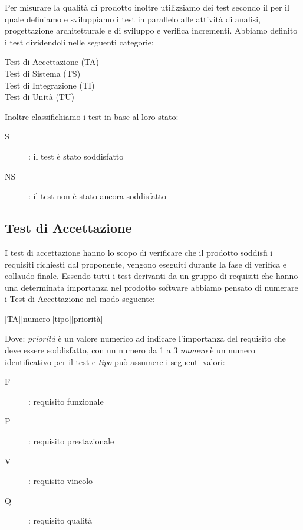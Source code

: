 \documentclass[../piano-di-qualifica.tex]{subfiles}
\begin{document}
\label{sub:test}
    Per misurare la qualità di prodotto inoltre utilizziamo dei test secondo il  per il quale definiamo e sviluppiamo i test in parallelo alle attività di analisi, progettazione architetturale e di sviluppo e verifica incrementi.
    Abbiamo definito i test dividendoli nelle seguenti categorie:
    \begin{description}
      \item [Test di Accettazione (TA)]
      \item [Test di Sistema (TS)]
      \item [Test di Integrazione (TI)]
      \item [Test di Unità (TU)]
    \end{description}
    Inoltre classifichiamo i test in base al loro stato:
      \begin{description}
        \item [S]: il test è stato soddisfatto
        \item [NS]: il test non è stato ancora soddisfatto
      \end{description}
  \subsection{Test di Accettazione}%
  \label{subs:accettazione}
      I test di accettazione hanno lo scopo di verificare che il prodotto soddisfi i requisiti richiesti dal proponente, vengono eseguiti durante la fase di verifica e collaudo finale.
      Essendo tutti i test derivanti da un gruppo di requisiti che hanno una determinata importanza nel prodotto software abbiamo pensato di numerare i Test di Accettazione nel modo seguente:
      \begin{center}
          [TA][numero][tipo][priorità]
      \end{center}
      Dove: \textit{priorità} è un valore numerico ad indicare l'importanza del requisito che deve essere soddisfatto, con un numero da 1 a 3 \textit{numero} è un numero identificativo per il test e \textit{tipo} può assumere i seguenti valori:
      \begin{description}
        \item [F]: requisito funzionale
        \item [P]: requisito prestazionale
        \item [V]: requisito vincolo
        \item [Q]: requisito qualità
      \end{description}
\end{document}
